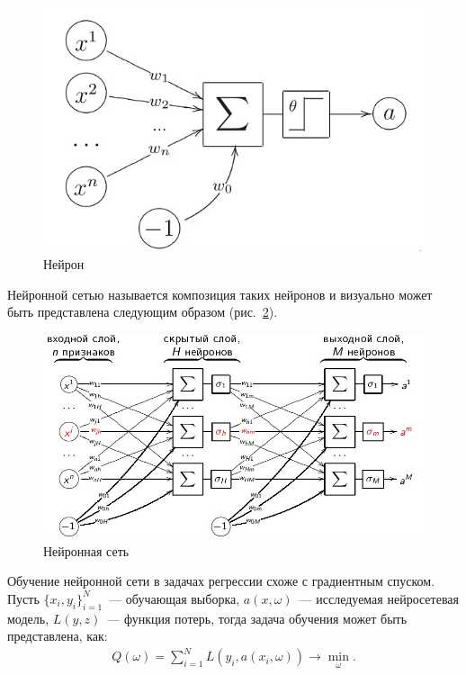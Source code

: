 \documentclass[12pt,a4paper]{article} %
\begin{document}
\begin{figure}[h]
	
	\centering
	
	\includegraphics[width=0.5\linewidth]{neyron.jpg}
	
	\caption{Нейрон}
	
	\label{fig:neyron}
	
\end{figure}

Нейронной сетью называется композиция таких нейронов и визуально может быть представлена следующим образом\cite{Jaderberg} (рис.~\ref{fig:neyron_net}).
\begin{figure}[h]
	
	\centering
	
	\includegraphics[width=0.8\linewidth]{neyron_net.jpg}
	
	\caption{Нейронная сеть}
	
	\label{fig:neyron_net}
	
\end{figure}

Обучение нейронной сети в задачах регрессии схоже с градиентным спуском. Пусть $\{x_i, y_i\}_{i=1}^{N}$~--- обучающая выборка, $a(x,\omega)$~--- исследуемая нейросетевая модель, $L(y,z)$~--- функция потерь, тогда задача обучения может быть представлена, как:
\begin{gather}\label{ney2}
	Q(\omega) = \sum\limits_{i=1}^{N}L(y_i, a(x_i, \omega)) \rightarrow \min_{\omega}.
\end{gather}
\end{document}
